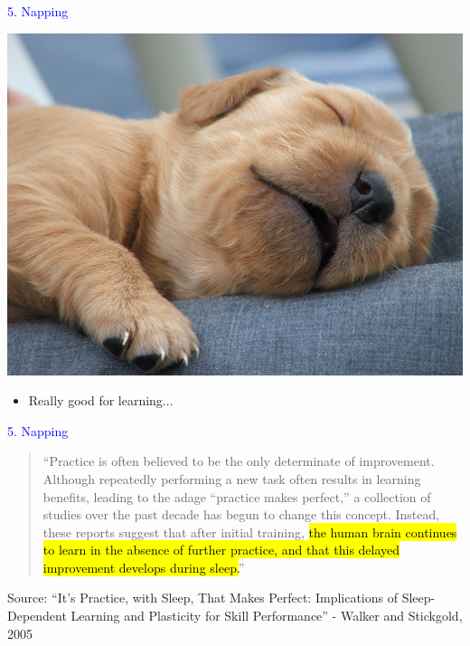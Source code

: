 \documentclass[landscape]{slides}
\begin{document}
\begin{slide}

    \textcolor{blue}{\Large{5. Napping}}

    \begin{center}
        \includegraphics[height=10cm]{dog-napping}
    \end{center}

    \begin{itemize}
        \item Really good for learning...
    \end{itemize}

\end{slide}


\begin{slide}

    \textcolor{blue}{\Large{5. Napping}}

    \begin{quote}
        ``Practice is often believed to be the only determinate of improvement. Although repeatedly performing a new task often results in learning benefits, leading to the adage ``practice makes perfect,'' a collection of studies over the past decade has begun to change this concept. Instead, these reports suggest that after initial training, \hl{the human brain continues to learn in the absence of further practice, and that this delayed improvement develops during sleep.}''
    \end{quote}

    \small{Source: ``It's Practice, with Sleep, That Makes Perfect: Implications of Sleep-Dependent Learning and Plasticity for Skill Performance'' - Walker and Stickgold, 2005}

\end{slide}
\end{document}
